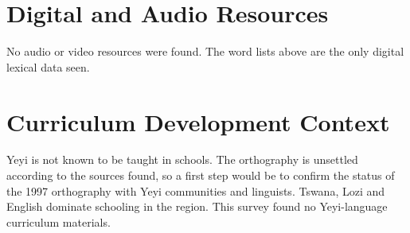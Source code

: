 \documentclass[12pt]{article}
\begin{document}
\section{Digital and Audio Resources}
No audio or video resources were found. The word lists above are the only digital lexical data seen.

\section{Curriculum Development Context}
Yeyi is not known to be taught in schools. The orthography is unsettled according to the sources found, so a first step would be to confirm the status of the 1997 orthography with Yeyi communities and linguists. Tswana, Lozi and English dominate schooling in the region. This survey found no Yeyi-language curriculum materials.
\end{document}
